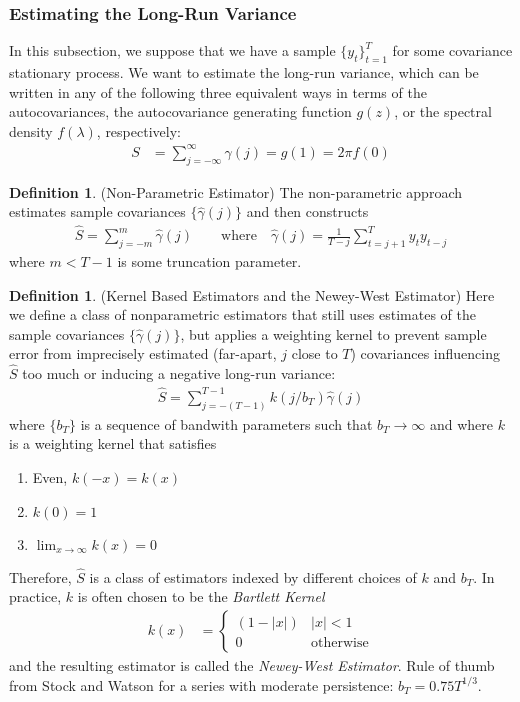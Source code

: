 \documentclass[12pt]{article}
\theoremstyle{plain}
\theoremstyle{definition}
\newtheorem{defn}[thm]{Definition}
\theoremstyle{remark}
\newcommand{\ra}{\rightarrow}
\newcommand{\tT}{_{t=1}^T}
\begin{document}
\clearpage
\subsubsection{Estimating the Long-Run Variance}
\label{sec:hac}

In this subsection, we suppose that we have a sample $\{y_t\}\tT$ for
some covariance stationary process.
We want to estimate the long-run variance, which can be written in any
of the following three equivalent ways in terms of the autocovariances,
the autocovariance generating function $g(z)$, or the spectral density
$f(\lambda)$, respectively:
\begin{align*}
  S &= \sum_{j=-\infty}^\infty \gamma(j)
  = g(1)
  = 2\pi f(0)
\end{align*}

\begin{defn}(Non-Parametric Estimator)
The non-parametric approach estimates sample covariances
$\{\hat{\gamma}(j)\}$ and then constructs
\begin{align*}
  \hat{S} = \sum_{j=-m}^m \hat{\gamma}(j)
  \qquad \text{where}\quad
  \hat{\gamma}(j) = \frac{1}{T-j}\sum_{t=j+1}^T y_t y_{t-j}
\end{align*}
where $m<T-1$ is some truncation parameter.
\end{defn}

\begin{defn}(Kernel Based Estimators and the Newey-West Estimator)
Here we define a class of nonparametric estimators that still uses estimates
of the sample covariances $\{\hat{\gamma}(j)\}$, but applies a weighting
kernel to prevent sample error from imprecisely estimated (far-apart,
$j$ close to $T$) covariances influencing $\hat{S}$ too much or inducing
a negative long-run variance:
\begin{align*}
  \hat{S} = \sum_{j=-(T-1)}^{T-1} k(j/b_T)\hat{\gamma}(j)
\end{align*}
where $\{b_T\}$ is a sequence of bandwith parameters such that
$b_T\ra \infty$ and where $k$ is a weighting kernel that satisfies
\begin{enumerate}[label=(\roman*)]
  \item Even, $k(-x)=k(x)$
  \item $k(0)=1$
  \item $\lim_{x\ra\infty}k(x)=0$
\end{enumerate}
Therefore, $\hat{S}$ is a class of estimators indexed by different
choices of $k$ and $b_T$.
In practice, $k$ is often chosen to be the \emph{Bartlett Kernel}
\begin{align*}
  k(x) &=
  \begin{cases}
    (1-|x|) & |x|<1 \\
    0 &\text{otherwise}
  \end{cases}
\end{align*}
and the resulting estimator is called the \emph{Newey-West Estimator}.
Rule of thumb from Stock and Watson for a series with moderate
persistence: $b_T=0.75 T^{1/3}$.
\end{defn}
\end{document}

